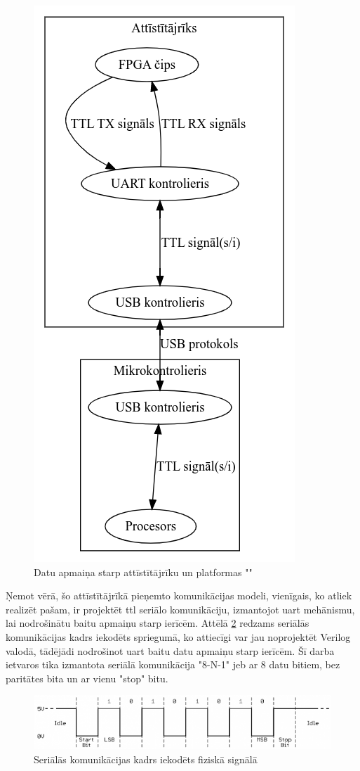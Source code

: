 \begin{figure}[H]
    \includegraphics[width=0.3\linewidth]{assets/agentcomms-grey.png}
    \centering
    \caption{Datu apmaiņa starp attīstītājrīku un platformas ""}
    \label{fig:agentcomms}
\end{figure}

Ņemot vērā, šo attīstītājrīkā pieņemto komunikācijas modeli, vienīgais, ko
atliek realizēt pašam, ir projektēt \gls{ttl} seriālo komunikāciju, izmantojot
\gls{uart} mehānismu, lai nodrošinātu baitu apmaiņu starp ierīcēm. Attēlā
\ref{fig:serialframe} redzams seriālās komunikācijas kadrs iekodēts spriegumā,
ko attiecīgi var jau noprojektēt Verilog valodā, tādējādi nodrošinot
 \gls{uart} baitu datu apmaiņu starp ierīcēm.
Šī darba ietvaros tika izmantota seriālā komunikācija "8-N-1" jeb ar 8 datu
bitiem, bez paritātes bita un ar vienu "stop" bitu.

\begin{figure}[H]
    \includegraphics[width=0.7\linewidth]{assets/ttl-serial-gray.png}
    \centering
    \caption{Seriālās komunikācijas kadrs iekodēts fiziskā signālā}
    \label{fig:serialframe}
\end{figure}
